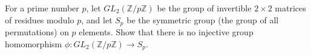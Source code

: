 For a prime number $p$, let $GL_2(\mathbb{Z}/p\mathbb{Z})$ be the group of invertible $2 \times 2$ matrices of residues modulo $p$, and let $S_p$ be the symmetric group (the group of all permutations) on $p$ elements. Show that there is no injective group homomorphism $\phi : GL_2(\mathbb{Z}/p\mathbb{Z}) \rightarrow S_p$.
